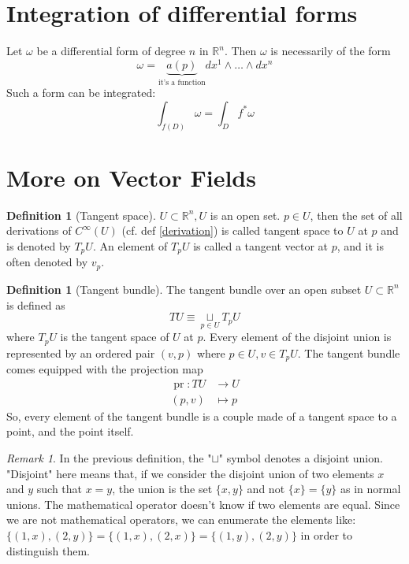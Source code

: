 \documentclass[a4paper,11pt,titlepage]{article}
\numberwithin{equation}{section}
\theoremstyle{definition}
\newtheorem{definition}[theorem]{Definition}
\theoremstyle{remark}
\newtheorem{remark}[theorem]{Remark}
\DeclareMathOperator{\pr}{pr}
\newcommand{\rfield}{\mathbb{R}}
\begin{document}
\newpage
\section{Integration of differential forms}

Let $\omega$ be a differential form of degree $n$ in $\rfield^n$. Then $\omega$ is necessarily of the form
\begin{equation}
  \omega = \underbrace{a(p)}_{\text{it's a function}} dx^1 \wedge \ldots \wedge dx^n
\end{equation}
Such a form can be integrated:
\begin{equation}
  \int_{f(D)} \omega = \int_D f^* \omega
\end{equation}
\newpage
\section{More on Vector Fields}
\begin{definition}[Tangent space]
  $U \subset \rfield^n, U$ is an open set. $p \in U$, then the set of all derivations of $C^\infty(U)$ (cf. def \ref{derivation}) is called tangent space to $U$ at $p$ and is denoted by $T_p U$. An element of $T_p U$ is called a tangent vector at $p$, and it is often denoted by $v_p$.
\end{definition}


\begin{definition}[Tangent bundle]
The tangent bundle over an open subset $U \subset \mathbb{R}^n$ is defined as
\begin{equation}
	TU \equiv \underset{p \in U}{\sqcup} T_p U
\end{equation}
where $T_p U$ is the tangent space of $U$ at $p$. Every element of the disjoint union is represented by an ordered pair $(v, p)$ where $p \in U, v \in T_p U$.
The tangent bundle comes equipped with the projection map
\begin{align}
  \pr \colon TU &\rightarrow U \\
  (p, v) &\mapsto p \nonumber
\end{align}
So, every element of the tangent bundle is a couple made of a tangent space to a point, and the point itself.
\end{definition}

\begin{remark}
  In the previous definition, the "$\sqcup$" symbol denotes a disjoint union. "Disjoint" here means that, if we consider the disjoint union of two elements $x$ and $y$ such that $x=y$, the union is the set $\{x, y\}$ and not $\{x\} = \{y\}$ as in normal unions. The mathematical operator doesn't know if two elements are equal. Since we are not mathematical operators, we can enumerate the elements like: $\{(1, x), (2, y)\} = \{(1, x), (2, x)\} = \{(1, y), (2, y)\}$ in order to distinguish them.
\end{remark}
\end{document}
